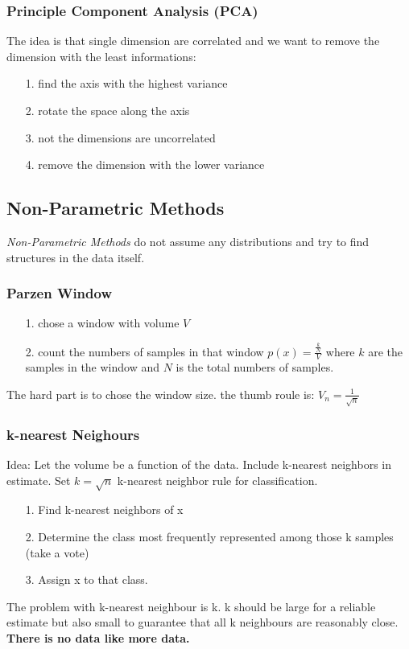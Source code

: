 \subsubsection{Principle Component Analysis (PCA)}
\label{sssect:principle-component-analysis-pca}
The idea is that single dimension are correlated and we want to remove the dimension with the least informations:
\begin{itemize}
	\item[1.] find the axis with the highest variance
	\item[2.] rotate the space along the axis
	\item[3.] not the dimensions are uncorrelated
	\item[4.] remove the dimension with the lower variance
\end{itemize}

\subsection{Non-Parametric Methods}
\label{ssect:non-parametric-methods}
\textit{Non-Parametric Methods} do not assume any distributions and try to find structures in the data itself.

\subsubsection{Parzen Window}
\label{sssect:parzen-window}
\begin{itemize}
	\item[1.] chose a window with volume $V$
	\item[2.] count the numbers of samples in that window $p(x) = \frac{\frac{k}{N}}{V}$ where $k$ are the samples in the window and $N$ is the total numbers of samples.
\end{itemize}
The hard part is to chose the window size. the thumb roule is: $V_n = \frac{1}{\sqrt{n}}$

\subsubsection{k-nearest Neighours}
\label{sssect:k-nearest-neighbours}
Idea: Let the volume be a function of the data. Include k-nearest neighbors in estimate. Set $k = \sqrt{n}$ k-nearest neighbor rule for classification.
\begin{itemize}
	\item[1.] Find k-nearest neighbors of x
	\item[2.] Determine the class most frequently represented among those k samples (take a vote)
	\item[3.] Assign x to that class.
\end{itemize}
The problem with k-nearest neighbour is k. k should be large for a reliable estimate but also small to guarantee that all k neighbours are reasonably close.\\
\textbf{There is no data like more data.}

